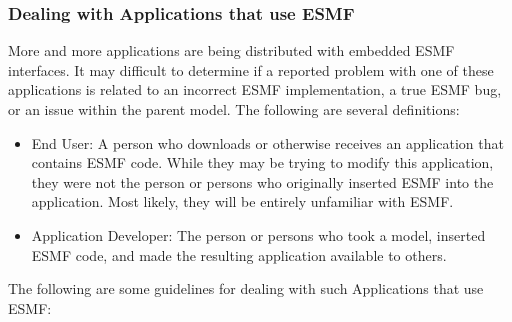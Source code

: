 \subsubsection{Dealing with Applications that use ESMF}
More and more applications are being distributed with embedded ESMF interfaces. It may 
difficult to determine if a reported problem with one of these applications is related 
to an incorrect ESMF implementation, a true ESMF bug, or an issue within the parent model.
The following are several definitions:
\begin{itemize}
\item End User: A person who downloads or otherwise receives an application that contains 
ESMF code.  While they may be trying to modify this application, they were not the person 
or persons who originally inserted ESMF into the application. Most likely, they will be 
entirely unfamiliar with ESMF.
\item Application Developer: The person or persons who took a model, inserted ESMF code, 
and made the resulting application available to others.
\end{itemize} 
The following are some guidelines for dealing with such Applications that use ESMF:
